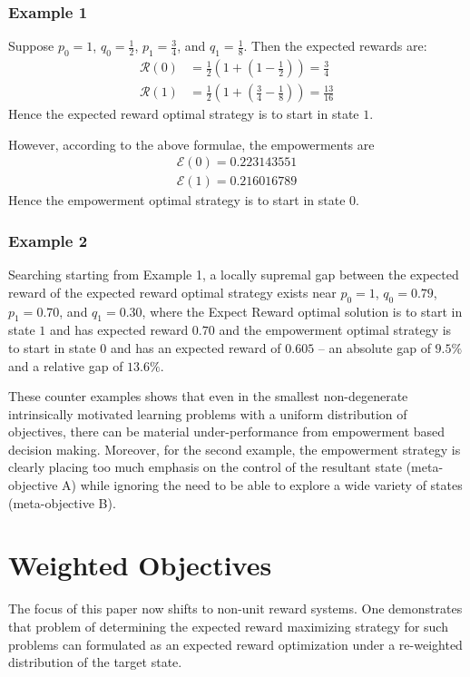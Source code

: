 \documentclass{article}
\newcommand{\Ee}{\mathcal{E}}
\newcommand{\Rr}{\mathcal{R}}
\begin{document}
\subsubsection{Example 1}
Suppose $p_0=1$, $q_0=\frac{1}{2}$, $p_1=\frac{3}{4}$, and $q_1 = \frac{1}{8}$. Then the expected rewards are:
\begin{align*}
\Rr(0) &= \frac{1}{2}\left(1+\left(1-\frac{1}{2}\right)\right)=\frac{3}{4}\\
\Rr(1) &= \frac{1}{2}\left(1+\left(\frac{3}{4}-\frac{1}{8}\right)\right)=\frac{13}{16}
\end{align*}
Hence the expected reward optimal strategy is to start in state $1$.

However, according to the above formulae, the empowerments are
\begin{align*}
\Ee(0)=0.223143551\\
\Ee(1)=0.216016789 
\end{align*}
Hence the empowerment optimal strategy is to start in state $0$.

\subsubsection{Example 2}
Searching starting from Example 1, a locally supremal gap between the expected reward of the expected reward optimal strategy exists near $p_0=1$, $q_0=0.79$, $p_1=0.70$, and $q_1 = 0.30$, where the Expect Reward optimal solution is to start in state $1$ and has expected reward $0.70$ and the empowerment optimal strategy is to start in state $0$ and has an expected reward of $0.605$ -- an absolute gap of $9.5\%$ and a relative gap of $13.6\%$.

These counter examples shows that even in the smallest non-degenerate intrinsically motivated learning problems with a uniform distribution of objectives, there can be material under-performance from empowerment based decision making. Moreover, for the second example, the empowerment strategy is clearly placing too much emphasis on the control of the resultant state (meta-objective A) while ignoring the need to be able to explore a wide variety of states (meta-objective B).
\section{Weighted Objectives}
The focus of this paper now shifts to non-unit reward systems. One demonstrates that problem of determining the expected reward maximizing strategy for such problems can formulated as an expected reward optimization under a re-weighted distribution of the target state.\\
\end{document}
